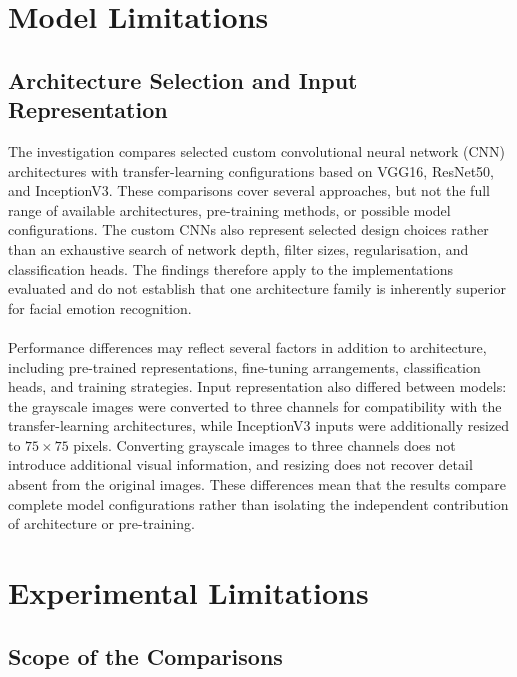 \documentclass[12pt, a4paper]{report}
\let\oldsection\section
\renewcommand{\section}{%
    \Needspace{6\baselineskip}%
    \oldsection
}
\let\oldsubsection\subsection
\renewcommand{\subsection}{%
    \Needspace{6\baselineskip}%
    \oldsubsection
}
\begin{document}
		\section{Model Limitations}
			
			\subsection{Architecture Selection and Input Representation}
				
				The investigation compares selected custom convolutional neural network (CNN) architectures with transfer-learning configurations based on VGG16, ResNet50, and InceptionV3. These comparisons cover several approaches, but not the full range of available architectures, pre-training methods, or possible model configurations. The custom CNNs also represent selected design choices rather than an exhaustive search of network depth, filter sizes, regularisation, and classification heads. The findings therefore apply to the implementations evaluated and do not establish that one architecture family is inherently superior for facial emotion recognition.\\\\
				Performance differences may reflect several factors in addition to architecture, including pre-trained representations, fine-tuning arrangements, classification heads, and training strategies. Input representation also differed between models: the grayscale images were converted to three channels for compatibility with the transfer-learning architectures, while InceptionV3 inputs were additionally resized to $75\times75$ pixels. Converting grayscale images to three channels does not introduce additional visual information, and resizing does not recover detail absent from the original images. These differences mean that the results compare complete model configurations rather than isolating the independent contribution of architecture or pre-training.
				
		\section{Experimental Limitations}
			
			\subsection{Scope of the Comparisons}
				
\end{document}
